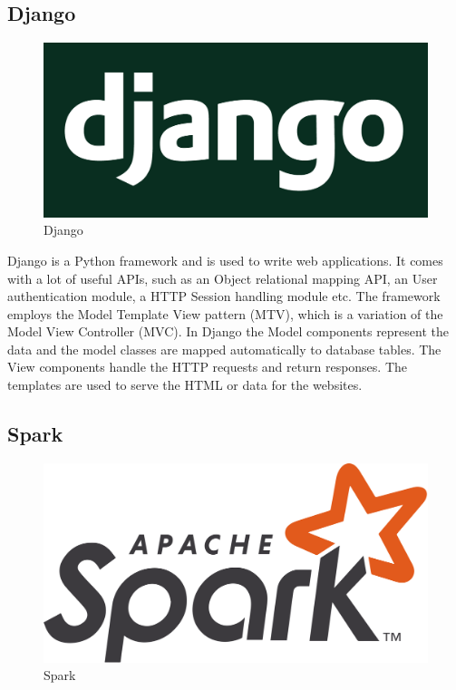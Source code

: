 \subsection{Django}

\begin{figure}[H]
	\centering
	\includegraphics[scale=0.15]{img/django.png}
	\caption{Django}
\end{figure} 


Django is a Python framework \cite{django} and is used to write web applications. It comes with a lot of useful APIs, such as an Object relational mapping API, an User authentication module, a HTTP Session handling module etc. The framework employs the Model Template View pattern (MTV), which is a variation of the Model View Controller (MVC). In Django the Model components represent the data and the model classes are mapped automatically to database tables. The View components handle the HTTP requests and return responses. The templates are used to serve the HTML or data for the websites.



\subsection{Spark}

\begin{figure}[H]
	\centering
	\includegraphics[scale=0.1]{img/spark.png}
	\caption{Spark}
\end{figure} 


